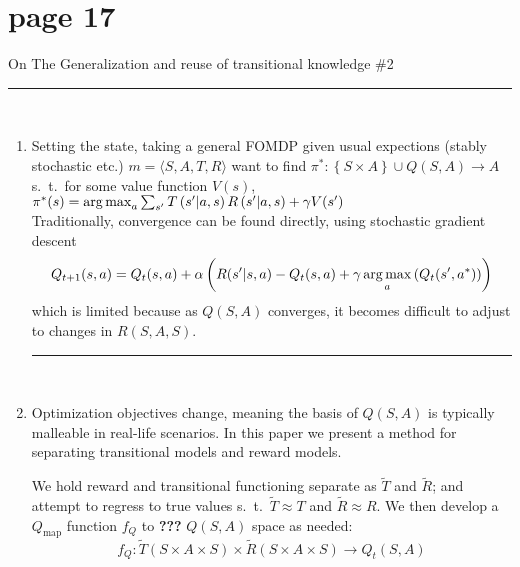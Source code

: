 \section*{page 17}

On The Generalization and reuse of transitional knowledge \#2\\

\hrule
{\ }\\
\begin{enumerate}[label=\protect\textcircled{\arabic*}]

\item Setting the state, taking a general FOMDP given usual expections (stably stochastic etc.) $m=\langle S,A,T,R \rangle$ want to find $\pi^{\ast}:\left\{ S \times A \right\} \cup Q(S,A) \rightarrow A$ s.\ t.\ for some value function $V(s)$, $\pi^{\ast}(s) = \operatorname*{arg\,max}_{a} \sum_{s^\prime} T \left( s^\prime \middle| a, s \right) R\left( s^\prime \middle| a, s \right) + \gamma V(s^\prime)$\\

Traditionally, convergence can be found directly, using stochastic gradient descent
\begin{equation*}
Q_{t+1}(s,a) = Q_t(s,a) +\alpha\left( R(s^\prime|s,a) -Q_t(s,a) + \gamma \operatorname*{arg\,max}_{a} \left( Q_t(s^\prime, a^\ast )\right)\right)
\end{equation*}
which is limited because as $Q(S,A)$ converges, it becomes difficult to adjust to changes in $R(S,A,S)$.
{\ }\\
\hrule
{\ }\\

\item Optimization objectives change, meaning the basis of $Q(S,A)$ is typically malleable in real-life scenarios. In this paper we present a method for separating transitional models and reward models.

We hold reward and transitional functioning separate as $\tilde{T}$ and $\tilde{R}$; and attempt to regress to true values s.\ t.\ $\tilde{T}\approx T$ and $\tilde{R} \approx R$. We then develop a $Q_{\text{map}}$ function $f_Q$ to \textbf{???} $Q(S,A)$ space as needed:
\begin{equation*}
f_Q:\tilde{T}\left( S \times A \times S \right) \times \tilde{R}\left( S \times A \times S \right) \rightarrow Q_t\left( S ,A \right)
\end{equation*}
\end{enumerate}